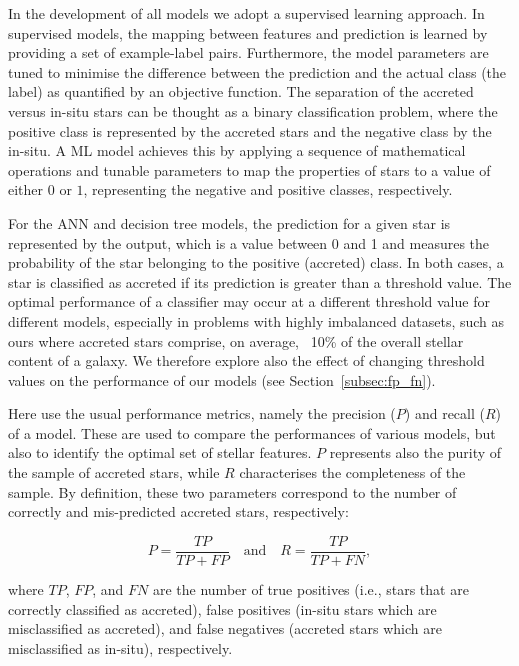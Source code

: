 In the development of all models we adopt a supervised learning approach. In supervised models, the mapping between features and prediction is learned by providing a set of example-label pairs. Furthermore, the model parameters are tuned to minimise the difference between the prediction and the actual class (the label) as quantified by an objective function. The separation of the accreted versus in-situ stars can be thought as a binary classification problem, where the positive class is represented by the accreted stars and the negative class by the in-situ. A ML model achieves this by applying a sequence of mathematical operations and tunable parameters to map the properties of stars to a value of either $0$ or $1$, representing the negative and positive classes, respectively.

For the ANN and decision tree models, the prediction for a given star is represented by the output, which is a value between 0 and 1 and measures the probability of the star belonging to the positive (accreted) class. In both cases, a star is classified as accreted if its prediction is greater than a threshold value. The optimal performance of a classifier may occur at a different threshold value for different models, especially in problems with highly imbalanced datasets, such as ours where accreted stars comprise, on average, ~10\% of the overall stellar content of a galaxy. We therefore explore also the effect of changing threshold values on the performance of our models (see Section~\ref{subsec:fp_fn}).

Here use the usual performance metrics, namely the precision ($P$) and recall ($R$) of a model. These are used to compare the performances of various models, but also to identify the optimal set of stellar features. $P$ represents also the purity of the sample of accreted stars, while $R$ characterises the completeness of the sample. By definition, these two parameters correspond to the number of correctly and mis-predicted accreted stars, respectively:

\begin{equation*}
    P = \frac{TP}{TP+FP} \quad \textrm{and} \quad  R = \frac{TP}{TP+FN},
\end{equation*}

\noindent where $TP$, $FP$, and $FN$ are the number of true positives (i.e., stars that are correctly classified as accreted), false positives (in-situ stars which are misclassified as accreted), and false negatives (accreted stars which are misclassified as in-situ), respectively.

